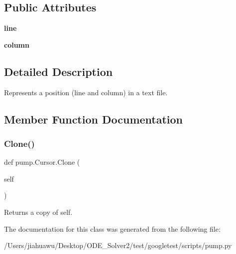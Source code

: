 \subsection*{Public Attributes}
\begin{DoxyCompactItemize}
\item 
\mbox{\label{classpump_1_1_cursor_aee8d8b67360da7fc4e635540cb41d48c}} 
{\bfseries line}
\item 
\mbox{\label{classpump_1_1_cursor_ae73db76c3a845a82afb334633864254e}} 
{\bfseries column}
\end{DoxyCompactItemize}


\subsection{Detailed Description}
\begin{DoxyVerb}Represents a position (line and column) in a text file.\end{DoxyVerb}
 

\subsection{Member Function Documentation}
\mbox{\label{classpump_1_1_cursor_af68c9be83b0af87db441b21bc6ce8114}} 
\subsubsection{\texorpdfstring{Clone()}{Clone()}}
{\footnotesize\ttfamily def pump.\+Cursor.\+Clone (\begin{DoxyParamCaption}\item[{}]{self }\end{DoxyParamCaption})}

\begin{DoxyVerb}Returns a copy of self.\end{DoxyVerb}
 

The documentation for this class was generated from the following file\+:\begin{DoxyCompactItemize}
\item 
/\+Users/jiahuawu/\+Desktop/\+O\+D\+E\+\_\+\+Solver2/test/googletest/scripts/pump.\+py\end{DoxyCompactItemize}
